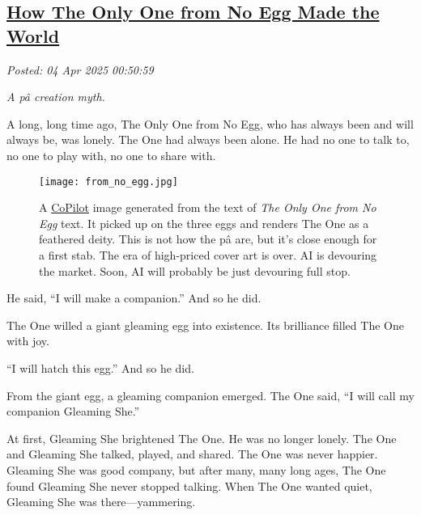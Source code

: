 %

\subsection*{\href{http://analyzethedatanotthedrivel.org/2025/04/03/how-the-only-one-from-no-egg-made-the-world/}{How The Only One from No Egg Made the World}}


\noindent\emph{Posted: 04 Apr 2025 00:50:59}
\vspace{6pt}

\emph{A pâ creation myth.}

A long, long time ago, The Only One from No Egg, who has always been and
will always be, was lonely. The One had always been alone. He had no one
to talk to, no one to play with, no one to share with.


 \captionsetup[figure]{labelformat=empty}
\begin{SCfigure}[50]
 \centering
 \texttt{[image: from\_no\_egg.jpg]}
 \caption[A \href{https://copilot.microsoft.com/}{CoPilot} image for \emph{The Only One from No Egg}.]{A \href{https://copilot.microsoft.com/}{CoPilot} image generated from the text of \emph{The Only One from No Egg} text. It picked up on the three eggs and renders The One as a feathered deity. This is not how the pâ are, but it’s close enough for a first stab. The era of high-priced cover art is over. AI is devouring the market. Soon, AI will probably be just devouring full stop.}
 \label{fig:8269x0}
 \end{SCfigure}


He said, ``I will make a companion.'' And so he did.

The One willed a giant gleaming egg into existence. Its brilliance
filled The One with joy.

``I will hatch this egg.'' And so he did.

From the giant egg, a gleaming companion emerged. The One said, ``I will
call my companion Gleaming She.''

At first, Gleaming She brightened The One. He was no longer lonely. The
One and Gleaming She talked, played, and shared. The One was never
happier. Gleaming She was good company, but after many, many long ages,
The One found Gleaming She never stopped talking. When The One wanted
quiet, Gleaming She was there---yammering.

